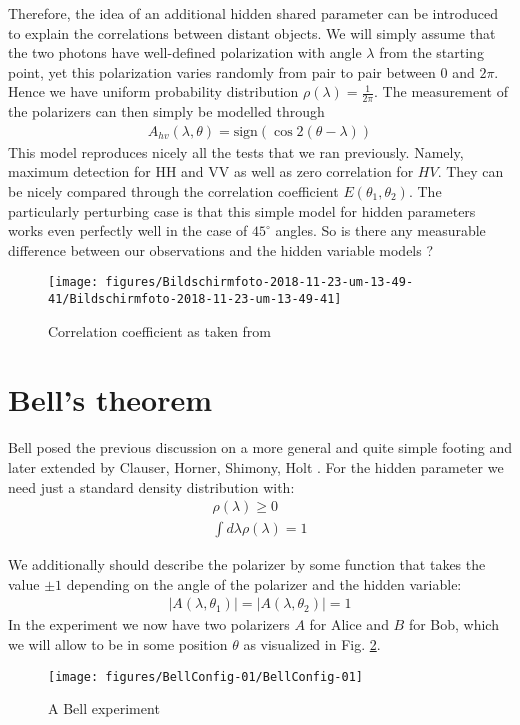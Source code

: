 \documentclass[10pt]{article}
\let\cite\citep
\providecommand\citep{\cite}
\begin{document}
Therefore, the idea of an additional hidden shared parameter can be introduced to explain the correlations between distant objects. We will simply assume that the two photons have well-defined polarization with angle $\lambda$ from the starting point, yet this polarization varies randomly from pair to pair between 0 and $2\pi$. Hence we have uniform probability distribution $\rho(\lambda) = \frac{1}{2\pi}$. The measurement of the polarizers can then simply be modelled through 
\begin{align}
A_{hv}(\lambda, \theta) =\text{sign}\left(\cos2 (\theta-\lambda)\right)
\end{align}
This model reproduces nicely all the tests that we ran previously. Namely, maximum detection for HH and VV as well as zero correlation for $HV$. They can be nicely compared through the correlation coefficient $E(\theta_1,\theta_2)$. The particularly perturbing case is that this simple model for hidden parameters works even perfectly well in the case of $45^\circ$ angles. So is there any measurable difference between our observations and the hidden variable models ?
\begin{figure}[h!]
\begin{center}
\texttt{[image: figures/Bildschirmfoto-2018-11-23-um-13-49-41/Bildschirmfoto-2018-11-23-um-13-49-41]}
\caption{{Correlation coefficient as taken from~~\protect\cite{grynberg}
{\label{649269}}%
}}
\end{center}
\end{figure}

\section{Bell's theorem}

Bell posed the previous discussion on a more general and quite simple footing \cite{Bell_1964} and later extended by Clauser, Horner, Shimony, Holt \cite{Clauser_1969}. For the hidden parameter we need just a standard density distribution with:
\begin{align}
\rho(\lambda)\geq 0\\
\int d\lambda \rho(\lambda) = 1
\end{align}

We additionally should describe the polarizer by some function that takes the value $\pm 1$ depending on the angle of the polarizer and the hidden variable:
\begin{align}
|A(\lambda, \theta_1) |= |A(\lambda, \theta_2) | =1
\end{align}
In the experiment we now have two polarizers $A$ for Alice and $B$ for Bob, which we will allow to be in some position $\theta$ as visualized in Fig. \ref{617669}.
\begin{figure}[h!]
\begin{center}
\texttt{[image: figures/BellConfig-01/BellConfig-01]}
\caption{{A Bell experiment
{\label{617669}}%
}}
\end{center}
\end{figure}
\end{document}
